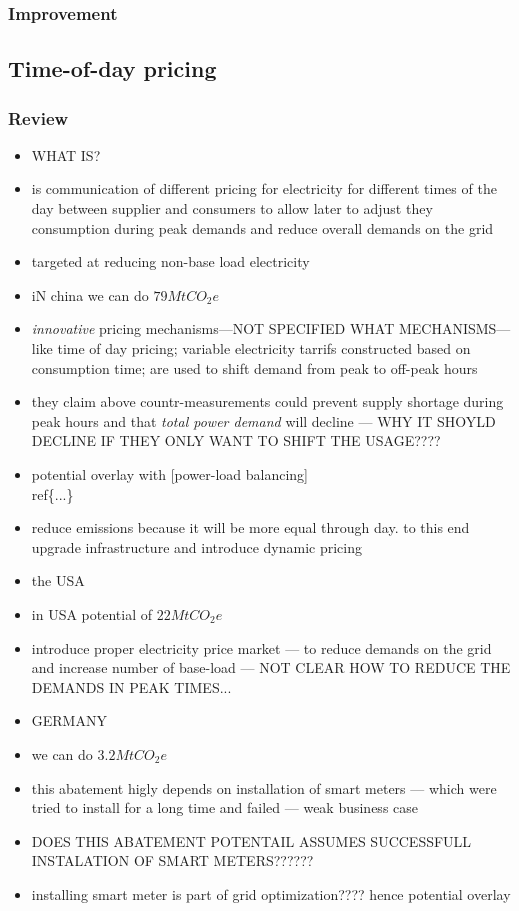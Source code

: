 \documentclass[11pt, twocolumn]{article}
\begin{document}
\subsubsection{Improvement}

\subsection{Time-of-day pricing}
\subsubsection{Review}
\begin{itemize}
\item WHAT IS?
\item is communication of different pricing for electricity for different times of the day between supplier and consumers to allow later to adjust they consumption during peak demands and reduce overall demands on the grid
\item targeted at reducing non-base load electricity


\item iN china we can do $79 Mt CO_2e$
\item \emph{innovative} pricing mechanisms---NOT SPECIFIED WHAT MECHANISMS--- like time of day pricing; variable electricity tarrifs constructed based on consumption time; are used to shift demand from peak to off-peak hours
\item they claim above countr-measurements could prevent supply shortage during peak hours and that \emph{total power demand} will decline --- WHY IT SHOYLD DECLINE IF THEY ONLY WANT TO SHIFT THE USAGE????
\item potential overlay with  [power-load balancing]\\ref\{...\}
\item reduce emissions because it will be more equal through day. to this end upgrade infrastructure and introduce dynamic pricing


\item the USA
\item in USA potential of $22 MtCO_2e$
\item introduce proper electricity price market --- to reduce demands on the grid and increase number of base-load --- NOT CLEAR HOW TO REDUCE THE DEMANDS IN PEAK TIMES...

\item GERMANY
\item we can do $3.2 Mt CO_2e$
\item this abatement higly depends on installation of smart meters --- which were tried to install for a long time and failed --- weak business case
\item DOES THIS ABATEMENT POTENTAIL ASSUMES SUCCESSFULL INSTALATION OF SMART METERS??????
\item installing smart meter is part of grid optimization???? hence potential overlay


\end{itemize}
\end{document}
